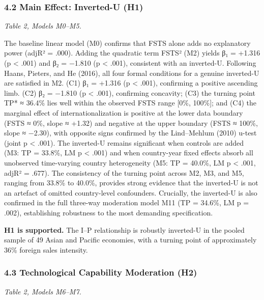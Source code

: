 \documentclass[12pt,a4paper]{article}
\begin{document}
\hypertarget{42-main-effect-inverted-u-h1}{%
\subsubsection{4.2 Main Effect: Inverted-U
(H1)}\label{42-main-effect-inverted-u-h1}}

\emph{Table 2, Models M0--M5.}

The baseline linear model (M0) confirms that FSTS alone adds no
explanatory power (adjR² = .000). Adding the quadratic term FSTS² (M2)
yields β₁ = +1.316 (p \textless{} .001) and β₂ = −1.810 (p \textless{}
.001), consistent with an inverted-U. Following Haans, Pieters, and He
(2016), all four formal conditions for a genuine inverted-U are
satisfied in M2. (C1) β₁ = +1.316 (p \textless{} .001), confirming a
positive ascending limb. (C2) β₂ = −1.810 (p \textless{} .001),
confirming concavity; (C3) the turning point TP* ≈ 36.4\% lies well
within the observed FSTS range {[}0\%, 100\%{]}; and (C4) the marginal
effect of internationalization is positive at the lower data boundary
(FSTS ≈ 0\%, slope ≈ +1.32) and negative at the upper boundary (FSTS ≈
100\%, slope ≈ −2.30), with opposite signs confirmed by the Lind--Mehlum
(2010) u-test (joint p \textless{} .001). The inverted-U remains
significant when controls are added (M3: TP = 33.8\%, LM p \textless{}
.001) and when country-year fixed effects absorb all unobserved
time-varying country heterogeneity (M5: TP = 40.0\%, LM p \textless{}
.001, adjR² = .677). The consistency of the turning point across M2, M3,
and M5, ranging from 33.8\% to 40.0\%, provides strong evidence that the
inverted-U is not an artefact of omitted country-level confounders.
Crucially, the inverted-U is also confirmed in the full three-way
moderation model M11 (TP = 34.6\%, LM p = .002), establishing robustness
to the most demanding specification.

\textbf{H1 is supported.} The I--P relationship is robustly inverted-U
in the pooled sample of 49 Asian and Pacific economies, with a turning
point of approximately 36\% foreign sales intensity.

\hypertarget{43-technological-capability-moderation-h2}{%
\subsubsection{4.3 Technological Capability Moderation
(H2)}\label{43-technological-capability-moderation-h2}}

\emph{Table 2, Models M6--M7.}
\end{document}
